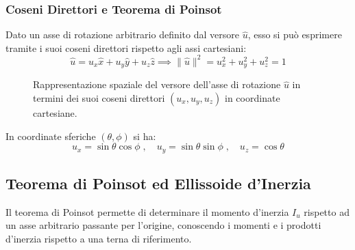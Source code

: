 \subsubsection{Coseni Direttori e Teorema di Poinsot}
Dato un asse di rotazione arbitrario definito dal versore $\hat{u}$, esso si può esprimere tramite i suoi coseni direttori rispetto agli assi cartesiani:
\begin{equation}
    \hat{u} = u_x \hat{x} + u_y \hat{y} + u_z \hat{z} \implies \|\hat{u}\|^2 = u_x^2 + u_y^2 + u_z^2 = 1
\end{equation}

\begin{figure}[ht]
\centering
{}
\caption{Rappresentazione spaziale del versore dell'asse di rotazione $\hat{u}$ in termini dei suoi coseni direttori $(u_x, u_y, u_z)$ in coordinate cartesiane.}
\end{figure}

In coordinate sferiche $(\theta, \phi)$ si ha:
\begin{equation}
    u_x = \sin\theta \cos\phi \; , \quad u_y = \sin\theta \sin\phi \; , \quad u_z = \cos\theta
\end{equation}

\subsection{Teorema di Poinsot ed Ellissoide d'Inerzia}
Il teorema di Poinsot permette di determinare il momento d'inerzia $I_u$ rispetto ad un asse arbitrario passante per l'origine, conoscendo i momenti e i prodotti d'inerzia rispetto a una terna di riferimento.

